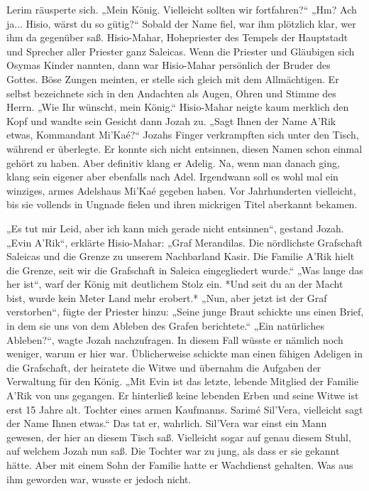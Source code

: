 Lerim räusperte sich. „Mein König. Vielleicht sollten wir fortfahren?“
„Hm? Ach ja... Hisio, wärst du so gütig?“
 Sobald der Name fiel, war ihm plötzlich klar, wer ihm da gegenüber saß. Hisio-Mahar, Hohepriester 
des Tempels der Hauptstadt und Sprecher aller Priester ganz Saleicas. Wenn die Priester und 
Gläubigen sich Osymas Kinder nannten, dann war Hisio-Mahar persönlich der Bruder des Gottes. Böse 
Zungen meinten, er stelle sich gleich mit dem Allmächtigen. Er selbst bezeichnete sich in den 
Andachten als Augen, Ohren und Stimme des Herrn.
„Wie Ihr wünscht, mein König.“ Hisio-Mahar neigte kaum merklich den Kopf und wandte sein Gesicht 
dann Jozah zu. „Sagt Ihnen der Name A'Rik etwas, Kommandant Mi'Kaé?“
Jozahs Finger verkrampften sich unter den Tisch, während er überlegte. Er konnte sich nicht 
entsinnen, diesen Namen schon einmal gehört zu haben. Aber definitiv klang er Adelig. Na, wenn man 
danach ging, klang sein eigener aber ebenfalls nach Adel. Irgendwann soll es wohl mal ein winziges, 
armes Adelshaus Mi'Kaé gegeben haben. Vor Jahrhunderten vielleicht, bis sie vollends in Ungnade 
fielen und ihren mickrigen Titel aberkannt bekamen.

„Es tut mir Leid, aber ich kann mich gerade nicht entsinnen“, gestand Jozah.
„Evin A'Rik“, erklärte Hisio-Mahar: „Graf Merandilas. Die nördlichste Grafschaft Saleicas und die 
Grenze zu unserem Nachbarland Kasir. Die Familie A'Rik hielt die Grenze, seit wir die Grafschaft in 
Saleica eingegliedert wurde.“
„Was lange das her ist“, warf der König mit deutlichem Stolz ein.
*Und seit du an der Macht bist, wurde kein Meter Land mehr erobert.*
„Nun, aber jetzt ist der Graf verstorben“, fügte der Priester hinzu: „Seine junge Braut schickte uns 
einen Brief, in dem sie uns von dem Ableben des Grafen berichtete.“
„Ein natürliches Ableben?“, wagte Jozah nachzufragen.
In diesem Fall wüsste er nämlich noch weniger, warum er hier war. Üblicherweise schickte man einen 
fähigen Adeligen in die Grafschaft, der heiratete die Witwe und übernahm die Aufgaben der Verwaltung 
für den König.
„Mit Evin ist das letzte, lebende Mitglied der Familie A'Rik von uns gegangen. Er hinterließ keine 
lebenden Erben und seine Witwe ist erst 15 Jahre alt. Tochter eines armen Kaufmanns. Sarimé 
Sil'Vera, vielleicht sagt der Name Ihnen etwas.“
Das tat er, wahrlich. Sil'Vera war einst ein Mann gewesen, der hier an diesem Tisch saß. Vielleicht 
sogar auf genau diesem Stuhl, auf welchem Jozah nun saß. Die Tochter war zu jung, als dass er sie 
gekannt hätte. Aber mit einem Sohn der Familie hatte er Wachdienst gehalten. Was aus ihm geworden 
war, wusste er jedoch nicht.
 
